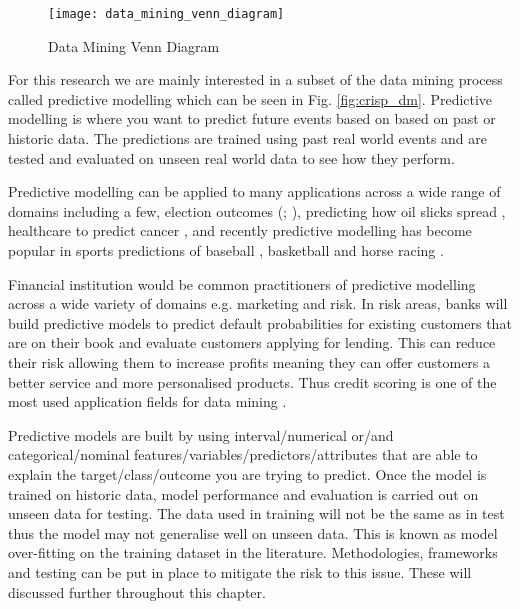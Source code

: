 \begin{figure}[H]
	\texttt{[image: data\_mining\_venn\_diagram]}
	\caption{Data Mining Venn Diagram}
	\label{fig:data_mining_venn_diagram}
\end{figure}

For this research we are mainly interested in a subset of the data mining process called predictive modelling which can be seen in Fig. \ref{fig:crisp_dm}. Predictive modelling is where you want to predict future events based on based on past or historic data. The predictions are trained using past real world events and are tested and evaluated on unseen real world data to see how they perform. 

Predictive modelling can be applied to many applications across a wide range of domains including a few, election outcomes (\citep{silver_signal_2012}; \cite{tumasjan_predicting_2010}), predicting how oil slicks spread \citep{liu_tracking_2011}, healthcare to predict cancer \citep{delen_predicting_2005}, and recently predictive modelling has become popular in sports predictions of baseball \citep{lewis_moneyball_2004}, basketball \citep{stekler_predicting_2012} and horse racing \citep{silverman_predicting_2013}.
 

Financial institution would be common practitioners of predictive modelling across a wide variety of domains e.g. marketing and risk. In risk areas, banks will build predictive models to predict default probabilities for existing customers that are on their book and evaluate customers applying for lending. This can reduce their risk allowing them to increase profits meaning they can offer customers a better service and more personalised products. Thus credit scoring is one of the most used application fields for
data mining \citep{baesens_50_2009}.

Predictive models are built by using interval/numerical or/and categorical/nominal features/variables/predictors/attributes that are able to explain the target/class/outcome you are trying to predict. Once the model is trained on historic data, model performance and evaluation is carried out on unseen data for testing. The data used in training will not be the same as in test thus the model may not generalise well on unseen data. This is known as model over-fitting on the training dataset in the literature. Methodologies, frameworks and testing can be put in place to mitigate the risk to this issue. These will discussed further throughout this chapter.


